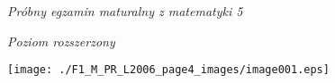 \documentclass[a4paper,12pt]{article}
\begin{document}
{\it Próbny egzamin maturalny z matematyki 5}

{\it Poziom rozszerzony}
\begin{center}
\texttt{[image: ./F1\_M\_PR\_L2006\_page4\_images/image001.eps]}
\end{center}
\end{document}
